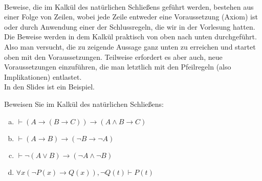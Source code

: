 \newcommand{\printpraesenzlsg}{false}
\newcommand{\printloesungen}{false}
\newcommand{\printbewertungen}{false}
\newcommand{\blattnummer}{3}



\iforiginal{}

	


\\
Beweise, die im Kalkül des natürlichen Schließens geführt werden, bestehen aus einer Folge von Zeilen, wobei jede Zeile entweder eine Voraussetzung (Axiom) ist oder durch Anwendung einer der Schlussregeln, die wir in der Vorlesung hatten.
Die Beweise werden in dem Kalkül praktisch von oben nach unten durchgeführt. Also man versucht, die zu zeigende Aussage ganz unten zu erreichen und startet oben mit den Voraussetzungen. Teilweise erfordert es aber auch, neue Voraussetzungen einzuführen, die man letztlich mit den Pfeilregeln (also Implikationen) entlastet.\\
In den Slides ist ein Beispiel.

Beweisen Sie im Kalkül des natürlichen Schließens:
\begin{enumerate}[a)]
  \item $\vdash (A\to(B\to C))\to(A\wedge B\to C)$
  \item $\vdash (A\to B)\to(\neg B\to \neg A)$
  \item $\vdash\neg(A\vee B)\to(\neg A\wedge \neg B)$
  \item $\forall x(\neg P(x)\to Q(x)),\neg Q(t)\vdash P(t)$
\end{enumerate}

